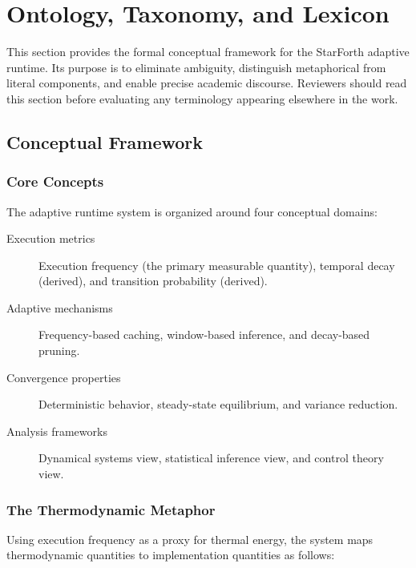 
\section{Ontology, Taxonomy, and Lexicon}
\label{sec:ontology}

This section provides the formal conceptual framework for the StarForth
adaptive runtime. Its purpose is to eliminate ambiguity, distinguish
metaphorical from literal components, and enable precise academic discourse.
Reviewers should read this section before evaluating any terminology appearing
elsewhere in the work.

\subsection{Conceptual Framework}

\subsubsection{Core Concepts}

The adaptive runtime system is organized around four conceptual domains:

\begin{description}
  \item[Execution metrics] Execution frequency (the primary measurable
    quantity), temporal decay (derived), and transition probability (derived).
  \item[Adaptive mechanisms] Frequency-based caching, window-based inference,
    and decay-based pruning.
  \item[Convergence properties] Deterministic behavior, steady-state
    equilibrium, and variance reduction.
  \item[Analysis frameworks] Dynamical systems view, statistical inference
    view, and control theory view.
\end{description}

\subsubsection{The Thermodynamic Metaphor}

Using execution frequency as a proxy for thermal energy, the system maps
thermodynamic quantities to implementation quantities as follows:

